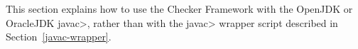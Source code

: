 %
%
%
%
%
%
%
%
%



This section explains how to use the Checker Framework with the OpenJDK or
OracleJDK \<javac>, rather than with the \<javac> wrapper script described in
Section~\ref{javac-wrapper}.

